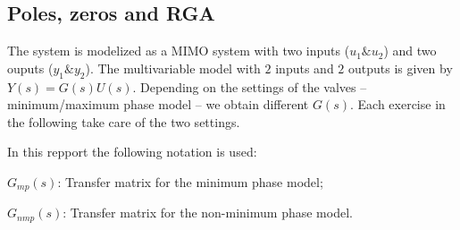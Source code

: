 \subsection{Poles, zeros and RGA}

The system is modelized as a MIMO system with two inputs ($u_1 \& u_2$) and two ouputs ($y_1 \& y_2$).
The multivariable model with $2$ inputs and $2$ outputs is given by $Y(s) = G(s)U(s)$.
Depending on the settings of the valves -- minimum/maximum phase model -- we obtain different $G(s)$.
Each exercise in the following take care of the two settings.

In this repport the following notation is used:

\begin{shortitemize}
    \item $G_{mp}(s)$: Transfer matrix for the minimum phase model;
    \item $G_{nmp}(s)$: Transfer matrix for the non-minimum phase model.
\end{shortitemize}
        






